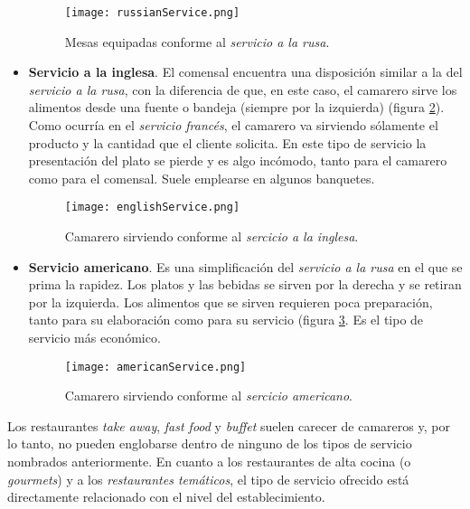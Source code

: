\begin{itemize}
  \begin{figure}[!h]
    \begin{center}
      \texttt{[image: russianService.png]}
      \caption{Mesas equipadas conforme al \emph{servicio a la rusa}.}
      \label{fig:russianService}
    \end{center}
  \end{figure}

  \item \textbf{Servicio a la inglesa}. El comensal encuentra una disposición
  similar a la del \emph{servicio a la rusa}, con la diferencia de que, en este
  caso, el camarero sirve los alimentos desde una fuente o bandeja (siempre por
  la izquierda) (figura \ref{fig:englishService}). Como ocurría en el
  \emph{servicio francés}, el camarero va sirviendo sólamente el producto y la
  cantidad que el cliente solicita. En este tipo de servicio la presentación 
  del plato se pierde y es algo incómodo, tanto para el camarero como para el 
  comensal. Suele emplearse en algunos banquetes.

  \begin{figure}[!h]
    \begin{center}
      \texttt{[image: englishService.png]}
      \caption{Camarero sirviendo conforme al \emph{sercicio a la inglesa}.}
      \label{fig:englishService}
    \end{center}
  \end{figure}

  \item \textbf{Servicio americano}. Es una simplificación del \emph{servicio a
  la rusa} en el que se prima la rapidez. Los platos y las bebidas se sirven
  por la derecha y se retiran por la izquierda. Los alimentos que se sirven
  requieren poca preparación, tanto para su elaboración como para su servicio
  (figura \ref{fig:americanService}. Es el tipo de servicio más económico.

  \begin{figure}[!h]
    \begin{center}
      \texttt{[image: americanService.png]}
      \caption{Camarero sirviendo conforme al \emph{sercicio americano}.}
      \label{fig:americanService}
    \end{center}
  \end{figure}

  \end{itemize}

  Los restaurantes \emph{take away}, \emph{fast food} y \emph{buffet} suelen
  carecer de camareros y, por lo tanto, no pueden englobarse dentro de ninguno 
  de los tipos de servicio nombrados anteriormente. En cuanto a los 
  restaurantes de alta cocina (o \emph{gourmets}) y a los \emph{restaurantes 
  temáticos}, el tipo de servicio ofrecido está directamente relacionado con 
  el nivel del establecimiento.

